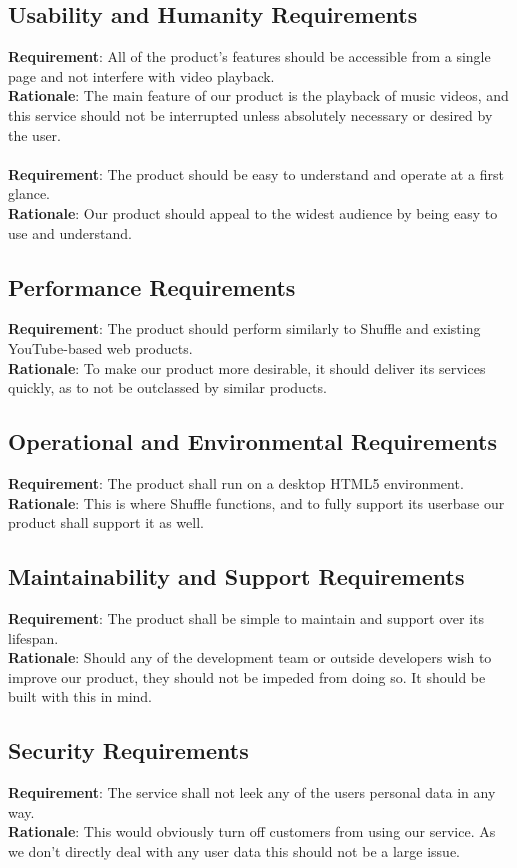 \documentclass[12pt, titlepage]{article}
\begin{document}
\subsection{Usability and Humanity Requirements}
\textbf{Requirement}: All of the product's features should be accessible from a single page and not interfere with video playback.\\
\textbf{Rationale}: The main feature of our product is the playback of music videos, and this service should not be interrupted unless absolutely necessary or desired by the user.\\\\
\textbf{Requirement}: The product should be easy to understand and operate at a first glance.\\
\textbf{Rationale}: Our product should appeal to the widest audience by being easy to use and understand.

\subsection{Performance Requirements}
\textbf{Requirement}: The product should perform similarly to Shuffle and existing YouTube-based web products.\\
\textbf{Rationale}: To make our product more desirable, it should deliver its services quickly, as to not be outclassed by similar products.

\subsection{Operational and Environmental Requirements}
\textbf{Requirement}: The product shall run on a desktop HTML5 environment.\\
\textbf{Rationale}: This is where Shuffle functions, and to fully support its userbase our product shall support it as well.

\subsection{Maintainability and Support Requirements}
\textbf{Requirement}: The product shall be simple to maintain and support over its lifespan.\\
\textbf{Rationale}: Should any of the development team or outside developers wish to improve our product, they should not be impeded from doing so.  It should be built with this in mind.

\color{red}
\subsection{Security Requirements}
\textbf{Requirement}: The service shall not leek any of the users personal data in any way.\\
\textbf{Rationale}: This would obviously turn off customers from using our service. As we don't directly deal with any user data this should not be a large issue.
\end{document}
